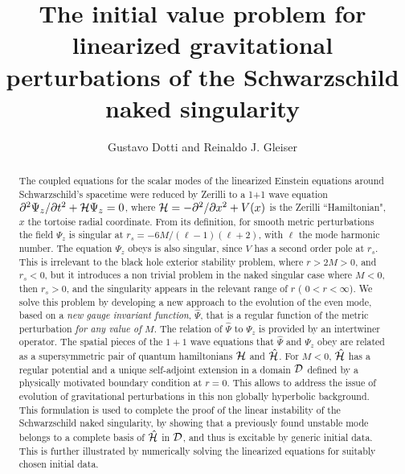 \documentclass[aps,floats,showpacs,amssymb,tightenlines]{revtex4}
\def\p{\partial}
\begin{document}
\title{The initial value problem for linearized gravitational perturbations of the Schwarzschild naked singularity}

\author{Gustavo Dotti and Reinaldo J. Gleiser}


\begin{abstract}
The coupled equations for the scalar modes of the linearized Einstein equations around Schwarzschild's spacetime were reduced 
by Zerilli to a 1+1 wave equation $\p^2 \Psi_z / \p t^2 + {\cal H} \Psi_z =0$,
where $ {\cal H} = -\p ^2 / \p x^2 + V(x)$ is the Zerilli ``Hamiltonian", 
$x$ the tortoise radial coordinate. 
From its definition, for smooth metric perturbations 
the field $\Psi_z$ is singular at $r_s=-6M/(\ell-1)(\ell+2)$, with $\ell$ the 
mode harmonic number. The equation $\Psi_z$ obeys is also singular, 
since $V$ has a second order pole at $r_s$.
This is irrelevant to the black hole exterior stability problem,
where $r>2M>0$, and $r_s <0$, but it introduces a non trivial problem in the naked singular case where $M<0$, 
then $r_s>0$,
and the singularity appears in the relevant range of $r$ ( $0 < r< \infty$).
We solve this problem by developing a new approach to the evolution of 
the even mode, based on a {\em new gauge invariant function}, $\hat \Psi$, that is a regular
 function of the metric perturbation
{\em for any value of $M$}.
The relation of $\hat \Psi$  to
 $\Psi_z$ is provided by an intertwiner operator. 
The spatial pieces of the $1+1$ wave equations
that $\hat \Psi$  and  $\Psi_z$  obey are related as a supersymmetric pair of quantum hamiltonians
${\cal H}$ and $\hat {\cal H}$. For $M<0$, 
 $\hat {\cal H}$ has a regular potential and a unique self-adjoint extension in 
a domain ${\cal D}$   
defined by a physically motivated boundary condition at $r=0$. This allows 
to address the issue of evolution of gravitational perturbations 
 in this non globally hyperbolic background.
 This formulation is used to complete the proof of the linear instability of
the  Schwarzschild naked singularity, by showing that a previously found unstable mode
belongs to a complete basis of $\hat {\cal H}$ in ${\cal D}$,
and thus is excitable by generic initial data. This is further illustrated by numerically solving the 
linearized equations for suitably chosen initial data. 
 \end{abstract}


\end{document}
